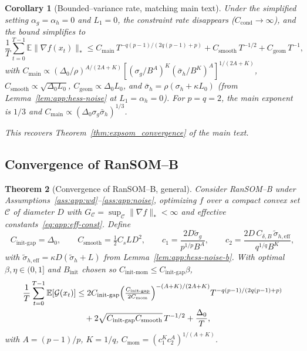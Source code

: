 \documentclass{article}
\theoremstyle{plain}
\newtheorem{theorem}{Theorem}[section]
\newtheorem{corollary}[theorem]{Corollary}
\theoremstyle{definition}
\theoremstyle{remark}
\begin{document}
\begin{corollary}[Bounded--variance rate, matching main text]
\label{cor:app:conv-e-simple}
Under the simplified setting $\alpha_g = \alpha_h = 0$ and $L_1 = 0$,
the constraint rate disappears ($C_{\mathrm{cond}} \to \infty$), and
the bound simplifies to
\begin{equation}
  \frac1T\sum_{t=0}^{T-1}\mathbb{E}\|\nabla f(x_t)\|_*
  \leq C_{\mathrm{main}}\, T^{-q(p-1)/(2q(p-1)+p)}
    + C_{\mathrm{smooth}}\, T^{-1/2}
    + C_{\mathrm{geom}}\, T^{-1},
  \label{eq:app:conv-e-simple}
\end{equation}
with $C_{\mathrm{main}} \propto (\Delta_0/\rho)^{A/(2A+K)}
[(\sigma_g/B^A)^K(\bar\sigma_h/B^K)^A]^{1/(2A+K)}$, $C_{\mathrm{smooth}}
\propto \sqrt{\Delta_0 L_0}$, $C_{\mathrm{geom}} \propto \Delta_0 L_0$,
and $\bar\sigma_h = \rho(\sigma_h + \kappa L_0)$ (from
Lemma~\ref{lem:app:hess-noise} at $L_1 = \alpha_h = 0$). For $p = q = 2$,
the main exponent is $1/3$ and $C_{\mathrm{main}} \propto (\Delta_0
\sigma_g\bar\sigma_h)^{1/3}$.

This recovers Theorem~\ref{thm:expsom_convergence} of the main text.
\end{corollary}


\subsection{Convergence of RanSOM--B}
\label{app:conv-b}

\begin{theorem}[Convergence of RanSOM--B, general]
\label{thm:app:conv-b}
Consider RanSOM--B under
Assumptions~\ref{ass:app:wd}--\ref{ass:app:noise}, optimizing $f$ over a
compact convex set $\mathcal{C}$ of diameter $D$ with $G_\mathcal{C} =
\sup_{\mathcal{C}}\|\nabla f\|_* < \infty$ and effective
constants~\eqref{eq:app:eff-const}. Define
\[
  C_{\mathrm{init\text{-}gap}} = \Delta_0, \qquad
  C_{\mathrm{smooth}} = \tfrac12 C_s L D^2, \qquad
  c_1 = \frac{2D\tilde\sigma_g}{p^{1/p} B^A}, \qquad
  c_2 = \frac{2D\, C_{\delta,B}\,\tilde\sigma_{h,\mathrm{eff}}}{q^{1/q} B^K},
\]
with $\tilde\sigma_{h,\mathrm{eff}} = \kappa D(\tilde\sigma_h + L)$ from
Lemma~\ref{lem:app:hess-noise-b}. With optimal $\beta, \eta \in (0, 1]$
and $B_{\mathrm{init}}$ chosen so $C_{\mathrm{init\text{-}mom}} \leq
C_{\mathrm{init\text{-}gap}}\beta$,
\begin{align}
  \frac1T\sum_{t=0}^{T-1}\mathbb{E}[\mathcal{G}(x_t)]
  &\leq 2C_{\mathrm{init\text{-}gap}}\Bigl(\tfrac{C_{\mathrm{init\text{-}gap}}}{2C_{\mathrm{mom}}}\Bigr)^{-(A+K)/(2A+K)}
      T^{-q(p-1)/(2q(p-1)+p)}
  \notag \\
  &\quad + 2\sqrt{C_{\mathrm{init\text{-}gap}} C_{\mathrm{smooth}}}\, T^{-1/2}
    + \frac{\Delta_0}{T},
  \label{eq:app:conv-b}
\end{align}
with $A = (p-1)/p$, $K = 1/q$, $C_{\mathrm{mom}} = (c_1^K c_2^A)^{1/(A+K)}$.
\end{theorem}
\end{document}
